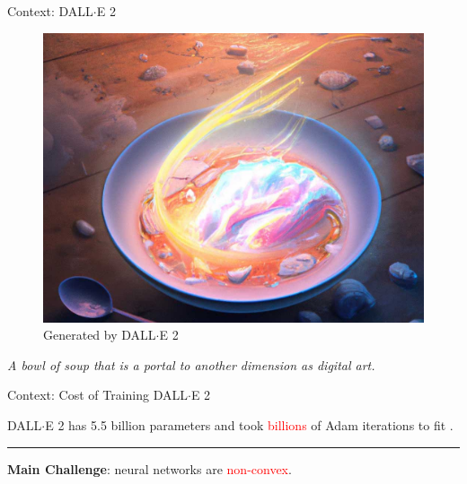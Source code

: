 \documentclass[usenames,dvipsnames,mathserif,notheorems]{beamer}
\newcommand{\horizontalrule}{
	{
			\vspace{-0.5em}
			\center \rule{\textwidth}{0.1em}
			\vspace{-0.2em}
		}
}
\newcommand{\red}[1]{\textcolor{Red}{#1}}
\begin{document}





\begin{frame}{Context: DALL$\cdot$E 2}

	\begin{figure}[]
		\centering
		\includegraphics[width=0.65\linewidth]{assets/bowl_of_soup.jpg}
		\caption*{Generated by DALL$\cdot$E 2}%
	\end{figure}

	\begin{center}
		\textit{\Large A bowl of soup that is a portal to another
			dimension as digital art.}
	\end{center}


\end{frame}

\begin{frame}{Context: Cost of Training DALL$\cdot$E 2}

	\begin{center}
		\Large
		DALL$\cdot$E 2 has 5.5 billion parameters and took \red{billions} of Adam
		iterations to fit \citep{ramesh2022dalle}.
	\end{center}

	\pause
	\horizontalrule

	\begin{center}
		\Large
		\textbf{Main Challenge}: neural networks are \textcolor{red}{non-convex}.
	\end{center}


	\begin{figure}[]
		\centering
		
	\end{figure}

\end{frame}
\end{document}
